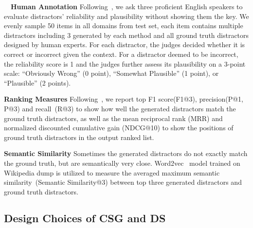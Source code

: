 ~~\textbf{Human Annotation} Following~\citet{jiang2017distractor}, we ask three proficient English speakers to evaluate distractors' reliability and plausibility without showing them the key. We evenly sample 50 items in all domains from test set, each item contains multiple distractors including 3 generated by each method and all ground truth distractors 
designed by human experts. For each distractor, the judges decided whether 
it is correct or incorrect given the context. For a distractor deemed to 
be incorrect, the reliability score is 1 and the judges further assess 
its plausibility on a 3-point scale: 
``Obviously Wrong'' (0 point), 
``Somewhat Plausible'' (1 point), 
or ``Plausible'' (2 points).  

\textbf{Ranking Measures} 
Following~\citet{liang2018distractor}, we report top F1 score(F1@3), 
precision(P@1, P@3) and recall~(R@3) to show how well the generated distractors 
match the ground truth distractors, 
as well as the mean reciprocal rank (MRR) and normalized discounted 
cumulative gain (NDCG@10) to show the positions of ground truth distractors 
in the output ranked list. 

\textbf{Semantic Similarity} Sometimes the generated distractors
do not exactly match the ground truth, but are semantically very close. 
Word2vec~\cite{mikolov2013distributed} model trained on Wikipedia dump 
is utilized to measure the averaged maximum semantic similarity~(Semantic Similarity@3) between top three generated 
distractors and ground truth distractors. 

\subsection{Design Choices of CSG and DS}
\label{sec:ablation}




